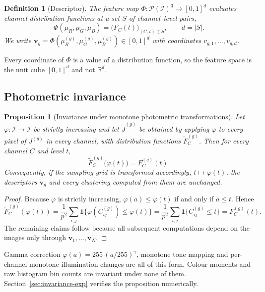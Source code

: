 \documentclass[pdflatex,sn-basic]{sn-jnl}
\theoremstyle{thmstyleone}%
\newtheorem{proposition}[theorem]{Proposition}%
\theoremstyle{thmstyletwo}%
\theoremstyle{thmstylethree}%
\newtheorem{definition}{Definition}%
\begin{document}
\begin{definition}[Descriptor]\label{def:feature}
The feature map $\Phi:\mathcal{P}(\mathcal{I})^3\to[0,1]^{d}$ evaluates channel
distribution functions at a set $S$ of channel--level pairs,
\begin{equation}
\Phi(\mu_R,\mu_G,\mu_B)=\big(F_C(t)\big)_{(C,t)\in S},\qquad d=|S|.
\end{equation}
We write $\mathbf{v}_g=\Phi(\mu^{(g)}_R,\mu^{(g)}_G,\mu^{(g)}_B)\in[0,1]^{d}$
with coordinates $v_{g,1},\dots,v_{g,d}$.
\end{definition}

Every coordinate of $\Phi$ is a value of a distribution function, so the
feature space is the unit cube $[0,1]^{d}$ and not $\mathbb{R}^{d}$.

\subsection{Photometric invariance}\label{sec:invariance}

\begin{proposition}[Invariance under monotone photometric
transformations]\label{prop:invariance}
Let $\varphi:\mathcal{I}\to\mathcal{I}$ be strictly increasing and let
$\widetilde{J}^{(g)}$ be obtained by applying $\varphi$ to every pixel of
$J^{(g)}$ in every channel, with distribution functions
$\widetilde{F}^{(g)}_C$. Then for every channel $C$ and level $t$,
\begin{equation}
\widetilde{F}^{(g)}_C\big(\varphi(t)\big)=F^{(g)}_C(t).
\end{equation}
Consequently, if the sampling grid is transformed accordingly,
$t\mapsto\varphi(t)$, the descriptors $\mathbf{v}_g$ and every clustering
computed from them are unchanged.
\end{proposition}

\begin{proof}
Because $\varphi$ is strictly increasing, $\varphi(a)\le\varphi(t)$ if and only
if $a\le t$. Hence
\begin{equation*}
\widetilde{F}^{(g)}_C(\varphi(t))
=\frac{1}{p^2}\sum_{i,j}\mathbf{1}\{\varphi(C^{(g)}_{ij})\le\varphi(t)\}
=\frac{1}{p^2}\sum_{i,j}\mathbf{1}\{C^{(g)}_{ij}\le t\}
=F^{(g)}_C(t).
\end{equation*}
The remaining claims follow because all subsequent computations depend on the
images only through $\mathbf{v}_1,\dots,\mathbf{v}_N$.
\end{proof}

Gamma correction $\varphi(a)=255\,(a/255)^{\gamma}$, monotone tone mapping and
per-channel monotone illumination changes are all of this form. Colour moments
and raw histogram bin counts are invariant under none of them.
Section~\ref{sec:invariance-exp} verifies the proposition numerically.
\end{document}
